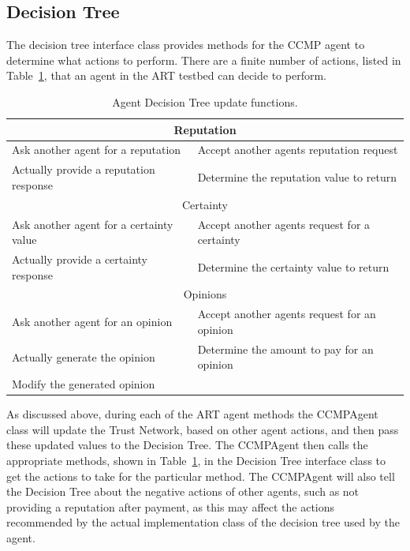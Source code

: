\subsection{Decision Tree}
The decision tree interface class provides methods for the CCMP agent to
determine what actions to perform.  There are a finite number of actions, listed in Table~\ref{table:DTUpdate},
that an agent in the ART testbed can decide to perform.
\begin{table}[h]
\centering
\begin{tabular}{|l|l|}
\hline
\multicolumn{2}{|c|}{Reputation} \\
\hline
Ask another agent for a reputation & Accept another agents reputation request \\
\hline
Actually provide a reputation response & Determine the reputation value to
return \\ 
\hline
\multicolumn{2}{|c|}{Certainty} \\
\hline
Ask another agent for a certainty value & Accept another agents request for a
certainty \\
\hline
Actually provide a certainty response & Determine the certainty value to return
\\
\hline
\multicolumn{2}{|c|}{Opinions} \\
\hline
Ask another agent for an opinion & Accept another agents request for an
opinion \\
\hline
Actually generate the opinion & Determine the amount to pay for an
opinion \\
\hline
Modify the generated opinion & \\
\hline
\end{tabular}
\caption{Agent Decision Tree update functions.}
\label{table:DTUpdate}
\end{table}

As discussed above, during each of the ART agent methods the CCMPAgent class
will update the Trust Network, based on other agent actions, and then pass these
updated values to the Decision Tree.  The CCMPAgent then calls the appropriate
methods, shown in Table~\ref{table:DTUpdate}, in the Decision Tree interface class 
to get the actions to take for the particular method.  The CCMPAgent will also 
tell the Decision Tree about the negative actions of other agents, such as not 
providing a reputation after payment, as this may affect the actions recommended 
by the actual implementation class of the decision tree used by the agent.  
